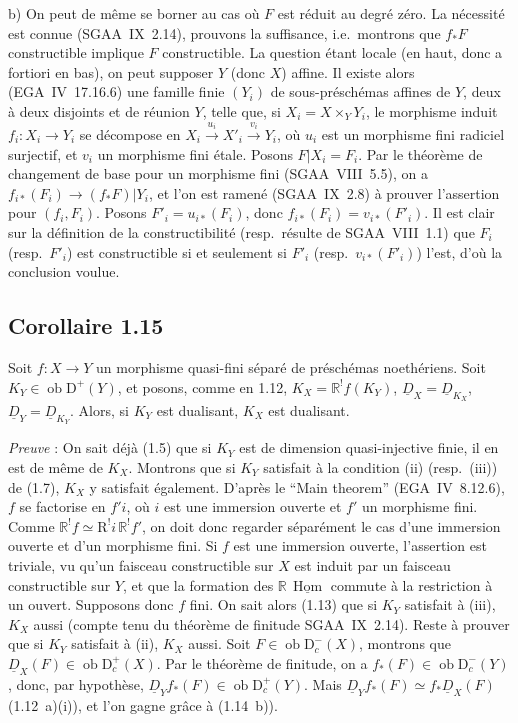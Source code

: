 \documentclass[11pt]{article}
\DeclareMathOperator{\Hom}{Hom}
\newcommand{\R}{\mathbb{R}}\newcommand{\RHomCore}{\mathbb{R}\mathrm{Hom}}
\newcommand{\D}{\mathrm{D}}
\newcommand{\ob}{\operatorname{ob}}
\providecommand{\Hom}{\operatorname{Hom}}
\providecommand{\ob}{\operatorname{ob}}
\providecommand{\R}{\mathrm R}
\providecommand{\Hom}{\operatorname{Hom}}
\begin{document}
b) On peut de même se borner au cas où $F$ est réduit au degré zéro. La nécessité est connue (SGAA~IX~2.14), prouvons la suffisance, i.e.~montrons que $f_{*}F$ constructible implique $F$ constructible. La question étant locale (en haut, donc a fortiori en bas), on peut supposer $Y$ (donc $X$) affine. Il existe alors (EGA~IV~17.16.6) une famille finie $(Y_i)$ de sous-préschémas affines de $Y$, deux à deux disjoints et de réunion $Y$, telle que, si $X_i = X \times_Y Y_i$, le morphisme induit $f_i : X_i \to Y_i$ se décompose en $X_i \xrightarrow{u_i} X'_i \xrightarrow{v_i} Y_i$, où $u_i$ est un morphisme fini radiciel surjectif, et $v_i$ un morphisme fini étale. Posons $F|X_i = F_i$. Par le théorème de changement de base pour un morphisme fini (SGAA~VIII~5.5), on a $f_{i*}(F_i) \to (f_{*}F)|Y_i$, et l'on est ramené (SGAA~IX~2.8) à prouver l'assertion pour $(f_i, F_i)$. Posons $F'_i = u_{i*}(F_i)$, donc $f_{i*}(F_i) = v_{i*}(F'_i)$. Il est clair sur la définition de la constructibilité (resp.~résulte de SGAA~VIII~1.1) que $F_i$ (resp.~$F'_i$) est constructible si et seulement si $F'_i$ (resp.~$v_{i*}(F'_i)$) l'est, d'où la conclusion voulue.

\subsection*{Corollaire 1.15}
Soit $f : X \to Y$ un morphisme quasi-fini séparé de préschémas noethériens. Soit $K_Y \in \ob \D^{+}(Y)$, et posons, comme en 1.12, $K_X = \R^{!}f(K_Y)$, $\underline{D}_X = \underline{D}_{K_X}$, $\underline{D}_Y = \underline{D}_{K_Y}$. Alors, si $K_Y$ est dualisant, $K_X$ est dualisant.

\emph{Preuve} : On sait déjà (1.5) que si $K_Y$ est de dimension quasi-injective finie, il en est de même de $K_X$. Montrons que si $K_Y$ satisfait à la condition (ii) (resp.~(iii)) de (1.7), $K_X$ y satisfait également. D'après le ``Main theorem'' (EGA~IV~8.12.6), $f$ se factorise en $f'i$, où $i$ est une immersion ouverte et $f'$ un morphisme fini. Comme $\R^{!}f \simeq \mathrm{R}^{!}i \, \R^{!}f'$, on doit donc regarder séparément le cas d'une immersion ouverte et d'un morphisme fini. Si $f$ est une immersion ouverte, l'assertion est triviale, vu qu'un faisceau constructible sur $X$ est induit par un faisceau constructible sur $Y$, et que la formation des $\R\,\underline{\Hom}$ commute à la restriction à un ouvert. Supposons donc $f$ fini. On sait alors (1.13) que si $K_Y$ satisfait à (iii), $K_X$ aussi (compte tenu du théorème de finitude SGAA~IX~2.14). Reste à prouver que si $K_Y$ satisfait à (ii), $K_X$ aussi. Soit $F \in \ob \D_c^{-}(X)$, montrons que $\underline{D}_X(F) \in \ob \D_c^{+}(X)$. Par le théorème de finitude, on a $f_{*}(F) \in \ob \D_c^{-}(Y)$, donc, par hypothèse, $\underline{D}_Y f_{*}(F) \in \ob \D_c^{+}(Y)$. Mais $\underline{D}_Y f_{*}(F) \simeq f_{*}\underline{D}_X(F)$ (1.12~a)(i)), et l'on gagne grâce à (1.14~b)).
\end{document}
